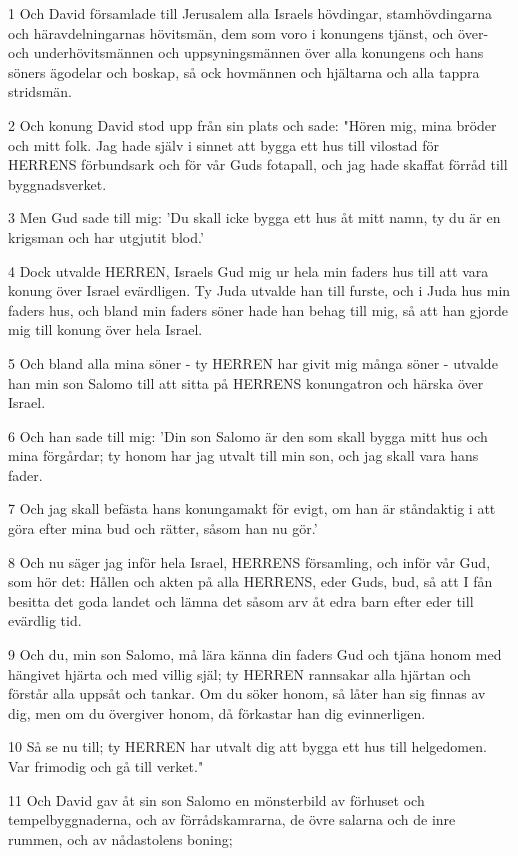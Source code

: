 \par 1 Och David församlade till Jerusalem alla Israels hövdingar, stamhövdingarna och häravdelningarnas hövitsmän, dem som voro i konungens tjänst, och över- och underhövitsmännen och uppsyningsmännen över alla konungens och hans söners ägodelar och boskap, så ock hovmännen och hjältarna och alla tappra stridsmän.
\par 2 Och konung David stod upp från sin plats och sade: "Hören mig, mina bröder och mitt folk. Jag hade själv i sinnet att bygga ett hus till vilostad för HERRENS förbundsark och för vår Guds fotapall, och jag hade skaffat förråd till byggnadsverket.
\par 3 Men Gud sade till mig: 'Du skall icke bygga ett hus åt mitt namn, ty du är en krigsman och har utgjutit blod.'
\par 4 Dock utvalde HERREN, Israels Gud mig ur hela min faders hus till att vara konung över Israel evärdligen. Ty Juda utvalde han till furste, och i Juda hus min faders hus, och bland min faders söner hade han behag till mig, så att han gjorde mig till konung över hela Israel.
\par 5 Och bland alla mina söner - ty HERREN har givit mig många söner - utvalde han min son Salomo till att sitta på HERRENS konungatron och härska över Israel.
\par 6 Och han sade till mig: 'Din son Salomo är den som skall bygga mitt hus och mina förgårdar; ty honom har jag utvalt till min son, och jag skall vara hans fader.
\par 7 Och jag skall befästa hans konungamakt för evigt, om han är ståndaktig i att göra efter mina bud och rätter, såsom han nu gör.'
\par 8 Och nu säger jag inför hela Israel, HERRENS församling, och inför vår Gud, som hör det: Hållen och akten på alla HERRENS, eder Guds, bud, så att I fån besitta det goda landet och lämna det såsom arv åt edra barn efter eder till evärdlig tid.
\par 9 Och du, min son Salomo, må lära känna din faders Gud och tjäna honom med hängivet hjärta och med villig själ; ty HERREN rannsakar alla hjärtan och förstår alla uppsåt och tankar. Om du söker honom, så låter han sig finnas av dig, men om du övergiver honom, då förkastar han dig evinnerligen.
\par 10 Så se nu till; ty HERREN har utvalt dig att bygga ett hus till helgedomen. Var frimodig och gå till verket."
\par 11 Och David gav åt sin son Salomo en mönsterbild av förhuset och tempelbyggnaderna, och av förrådskamrarna, de övre salarna och de inre rummen, och av nådastolens boning;
